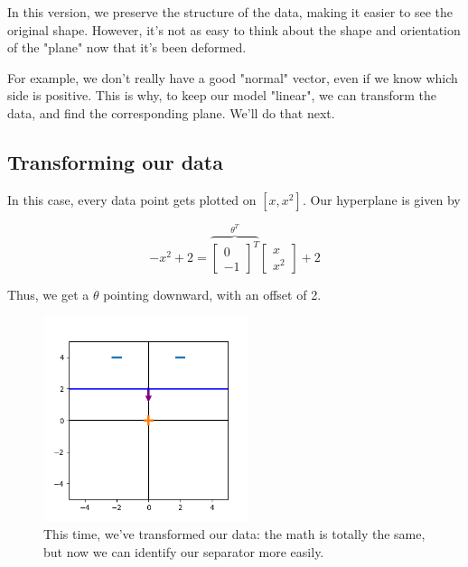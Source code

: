             In this version, we preserve the structure of the data, making it easier to see the original shape. However, it's not as easy to think about the shape and orientation of the "plane" now that it's been deformed. 
            
            For example, we don't really have a good "normal" vector, even if we know which side is positive. This is why, to keep our model "linear", we can transform the data, and find the corresponding plane. We'll do that next.
    
            \subsecdiv

        \subsection*{Transforming our data}
    
            In this case, every data point gets plotted on $[x,x^2]$. Our hyperplane is given by 
    
            \begin{equation}
                -x^2+2 = 
                \overbrace{
                \begin{bmatrix}
                    0 \\ -1
                \end{bmatrix}^T
                }^{\theta^T}
                \begin{bmatrix}
                    x \\ x^2
                \end{bmatrix}
                + 2
            \end{equation}
    
            Thus, we get a $\theta$ pointing downward, with an offset of 2.
    
            \begin{figure}[H]
                \centering
                \includegraphics[width=60mm,scale=0.5]{images/feature_images/nonlinear_data.png}
                \caption*{This time, we've transformed our data: the math is totally the same, but now we can identify our separator more easily.}
            \end{figure}
    
